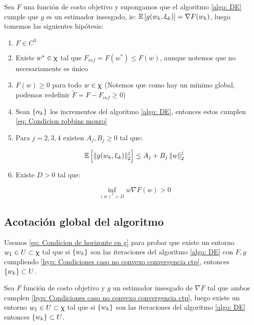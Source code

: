 \begin{hyp}
	\label{hyp: Condiciones caso no convexo convergencia ctp}
	Sea $F$ una funci\'on de costo objetivo y supongamos que el algoritmo \ref{algo: DE} cumple que $g$ es un estimador insesgado, ie: $\mathbb{E} \left[g(w_k, \upxi_{k})\right] = \nabla F(w_k)$, luego tomemos las siguientes hip\'otesis:
	
	\begin{enumerate}
		\item $F \in C^3$
		\item Existe $w^* \in \upchi$ tal que $F_{inf} = F(w^*) \leq F(w)$, aunque notemos que no necesariamente es \'unico
		\item $F(w) \geq 0$ para todo $w \in \upchi$ (Notemos que como hay un m\'inimo global, podemos redefinir $\widetilde{F} = F - F_{inf} \geq 0$)
		\item Sean $\left\lbrace\alpha_k\right\rbrace$ los incrementos del algoritmo \ref{algo: DE}, entonces estos cumplen \ref{eq: Condicion robbins monro}
		\item Para $j = 2, 3, 4$ existen $A_j,B_j \geq 0$ tal que:
		
		\begin{equation}
			\label{eq: Acotaciones momentos de g}
			\mathbb{E} \left[\left\lVert g(w_k, \upxi_{k})\right\rVert_2^j\right] \leq A_j + B_j \left\lVert w\right\rVert_2^j
		\end{equation}
		
		\item  Existe $D > 0$ tal que:
		
		\begin{equation}
			\label{eq: Condicion de horizonte en g}
			\inf\limits_{(w)^2 > D} {w \nabla F(w)} >0
		\end{equation}
	\end{enumerate}
	
\end{hyp}

\subsection{Acotaci\'on global del algoritmo}

Usemos \ref{eq: Condicion de horizonte en g} para probar que existe un entorno $w_1 \in U \subset \upchi$ tal que si $\left\lbrace w_k\right\rbrace$ son las iteraciones del algoritmo \ref{algo: DE} con $F,g$ cumpliendo \ref{hyp: Condiciones caso no convexo convergencia ctp}, entonces $\left\lbrace w_k\right\rbrace \subset U$.

\begin{theorem}
	\label{theorem: Acotaci\'on global del algoritmo estoc\'astico insesgado}
	Sea $F$ funci\'on de costo objetivo y $g$ un estimador insesgado de $\nabla F$ tal que ambos cumplen \ref{hyp: Condiciones caso no convexo convergencia ctp}, luego existe un entorno $w_1 \in U \subset \upchi$ tal que si $\left\lbrace w_k\right\rbrace$ son las iteraciones del algoritmo \ref{algo: DE} entonces $\left\lbrace w_k\right\rbrace \subset U$.
\end{theorem}

